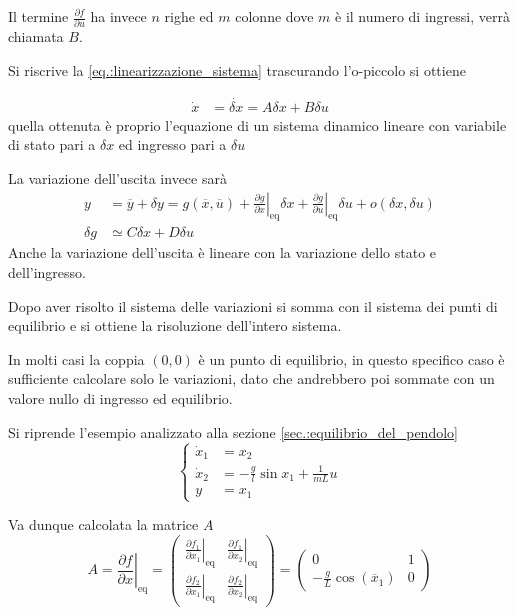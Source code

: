Il termine $\frac{\partial f}{\partial u}$ ha invece $n$ righe ed $m$ colonne
dove $m$ è il numero di ingressi, verrà chiamata $B$.

Si riscrive la \ref{eq.:linearizzazione_sistema} trascurando l'o-piccolo si
ottiene

$$\begin{aligned}
\dot x &= \dot{\delta x} = A\delta x + B \delta u
\end{aligned}$$
quella ottenuta è proprio l'equazione di un sistema dinamico lineare con
variabile di stato pari a $\delta x$ ed ingresso pari a $\delta u$

La variazione dell'uscita invece sarà
$$\begin{aligned}
y &= \overline{y} + \delta y = g(\overline{x},\overline{u}) +
\left.\frac{\partial
g}{\partial x}\right|_{\text{eq}}\delta x + \left.\frac{\partial g}{\partial
u}\right|_{\text{eq}}\delta u + o(\delta x, \delta u) \\
\delta g &\simeq C\delta x + D \delta u
\end{aligned}$$
Anche la variazione dell'uscita è lineare con la variazione dello stato e
dell'ingresso.

Dopo aver risolto il sistema delle variazioni si somma con il sistema dei
punti di equilibrio e si ottiene la risoluzione dell'intero sistema.

In molti casi la coppia $(0,0)$ è un punto di equilibrio, in questo specifico
caso è sufficiente calcolare solo le variazioni, dato che andrebbero poi
sommate con un valore nullo di ingresso ed equilibrio.

Si riprende l'esempio analizzato alla sezione \ref{sec.:equilibrio_del_pendolo}
$$\left\{\begin{aligned}
\dot x_1 &= x_2\\
\dot x_2 &= - \frac{g}{l}\sin{x_1} + \frac{1}{mL}u \\
y &= x_1
\end{aligned}\right.$$

Va dunque calcolata la matrice $A$
$$ A =
\left.\frac{\partial f }{\partial x}\right|_{\text{eq}} = \begin{pmatrix}
 \left.\frac{\partial f_1}{\partial x_1}\right|_{\text{eq}}
 & \left.\frac{\partial f_1}{\partial x_2}\right|_{\text{eq}} \\
 \left.\frac{\partial f_2}{\partial x_1}\right|_{\text{eq}}
 & \left.\frac{\partial f_2}{\partial x_2}\right|_{\text{eq}}
\end{pmatrix} =
\begin{pmatrix}
 0 & 1\\
 -\frac{g}{L}\cos(\overline{x}_1) & 0
\end{pmatrix} $$

